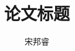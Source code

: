 \documentclass[bachelor]{thesis-uestc}
\title{论文标题}{Title of the Thesis}
\author{宋邦睿}{Bangrui Song}
\begin{document}
\makecover




\thesistableofcontents

% 
% 
% 
% 


% 
% 


% 

% 
% 
%

% 
% 
\end{document}
